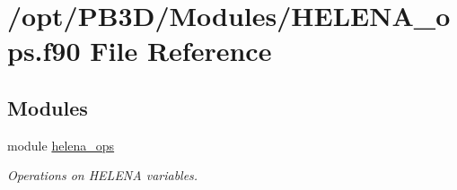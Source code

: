 \hypertarget{HELENA__ops_8f90}{}\section{/opt/\+P\+B3\+D/\+Modules/\+H\+E\+L\+E\+N\+A\+\_\+ops.f90 File Reference}
\label{HELENA__ops_8f90}
\subsection*{Modules}
\begin{DoxyCompactItemize}
\item 
module \hyperlink{namespacehelena__ops}{helena\+\_\+ops}
\begin{DoxyCompactList}\small\item\em Operations on H\+E\+L\+E\+NA variables. \end{DoxyCompactList}\end{DoxyCompactItemize}
